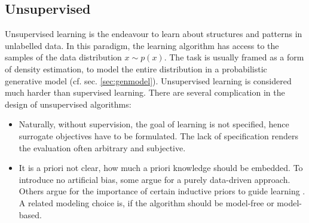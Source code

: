 	\subsection{Unsupervised}\label{sec:unsupervised}
		{Unsupervised learning} is the endeavour to learn about structures and patterns in unlabelled data. In this paradigm, the learning algorithm has access to the samples of the data distribution $x \sim p(x)$. The task is usually framed as a form of density estimation, \ie to model the entire distribution in a probabilistic generative model (cf. sec. \ref{sec:genmodel}).
		Unsupervised learning is considered much harder than supervised learning. There are several complication in the design of unsupervised algorithms:
		\begin{itemize}
			\item Naturally, without supervision, the goal of learning is not specified, hence surrogate objectives have to be formulated. The lack of specification renders the evaluation often arbitrary and subjective.
			\item It is a priori not clear, how much a priori knowledge should be embedded. To introduce no artificial bias, some argue for a purely data-driven approach. Others argue for the importance of certain inductive priors to guide learning \cite{tenenbaum18think}. A related modeling choice is, if the algorithm should be model-free or model-based. 
		\end{itemize}

